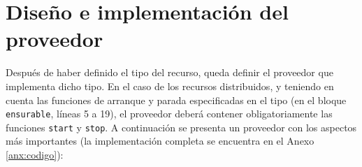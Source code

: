 \section{Diseño e implementación del proveedor}

Después de haber definido el tipo del recurso, queda definir el proveedor que implementa dicho tipo. En el caso de los recursos distribuidos, y teniendo en cuenta las funciones de arranque y parada especificadas en el tipo (en el bloque \texttt{ensurable}, líneas 5 a 19), el proveedor deberá contener obligatoriamente las funciones \texttt{start} y \texttt{stop}. A continuación se presenta un proveedor con los aspectos más importantes (la implementación completa se encuentra en el Anexo \ref{anx:codigo}):

